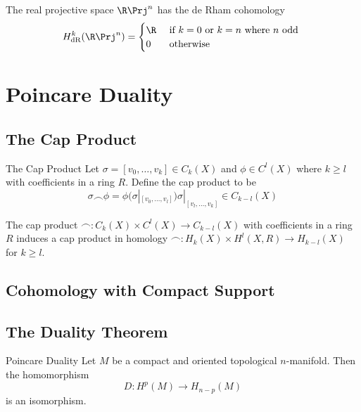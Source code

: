 \documentclass[a4paper]{article}
\begin{document}
\begin{prp}{}{} The real projective space $\R\Prj^n$ has the de Rham cohomology $$H_{\text{dR}}^k(\R\Prj^n)=\begin{cases}
\R & \text{ if }k=0\text{ or }k=n\text{ where }n\text{ odd }\\
0 & \text{ otherwise }
\end{cases}$$
\end{prp}

\pagebreak
\section{Poincare Duality}
\subsection{The Cap Product}
\begin{defn}{The Cap Product}{} Let $\sigma=[v_0,\dots,v_k]\in C_k(X)$ and $\phi\in C^l(X)$ where $k\geq l$ with coefficients in a ring $R$. Define the cap product to be $$\sigma\frown\phi=\phi(\sigma|_{[v_0,\dots,v_l]})\sigma|_{[v_l,\dots,v_k]}\in C_{k-l}(X)$$
\end{defn}

\begin{lmm}{}{} The cap product $\frown: C_k(X)\times C^l(X)\to C_{k-l}(X)$ with coefficients in a ring $R$ induces a cap product in homology $\frown: H_k(X)\times H^l(X,R)\to H_{k-l}(X)$ for $k\geq l$. 
\end{lmm}

\subsection{Cohomology with Compact Support}

\subsection{The Duality Theorem}
\begin{thm}{Poincare Duality}{} Let $M$ be a compact and oriented topological $n$-manifold. Then the homomorphism $$D:H^p(M)\to H_{n-p}(M)$$ is an isomorphism. 
\end{thm}
\end{document}
